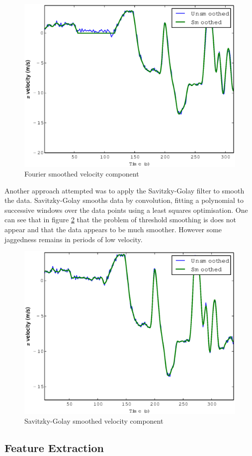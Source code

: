 \documentclass[11pt, a4paper, titlepage]{article}
\begin{document}
\begin{figure}
    \center
    \includegraphics[scale=0.6]{fouriersmooth}
    \caption{Fourier smoothed velocity component}
    \label{fig:fouriersmooth}
\end{figure}

Another approach attempted was to apply the Savitzky-Golay filter to smooth the data. Savitzky-Golay smooths data by convolution, fitting a polynomial to successive windows over the data points using a least squares optimisation. One can see that in figure \ref{fig:savgolsmooth} that the problem of threshold smoothing is does not appear and that the data appears to be much smoother. However some jaggedness remains in periods of low velocity.

\begin{figure}
    \center
    \includegraphics[scale=0.6]{savgolsmooth}
    \caption{Savitzky-Golay smoothed velocity component}
    \label{fig:savgolsmooth}
\end{figure}

\subsection{Feature Extraction}
\end{document}
